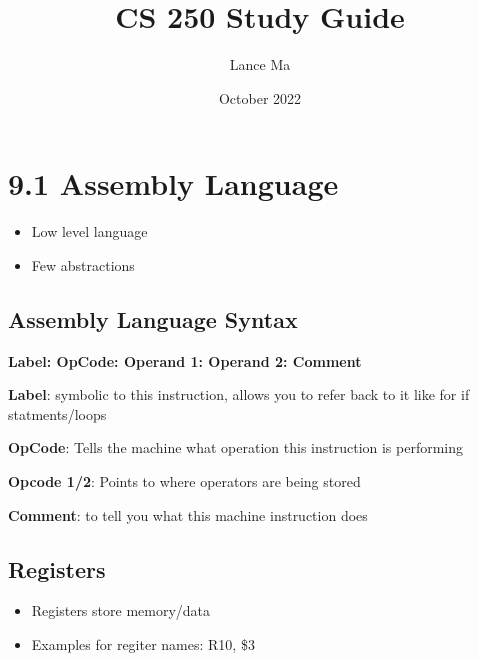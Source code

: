 \documentclass{article}
\title{CS 250 Study Guide}
\author{Lance Ma}
\date{October 2022}
\begin{document}
\maketitle

\section{9.1 Assembly Language}

\begin{itemize}
    \item Low level language
    
    \item Few abstractions
\end{itemize}


\subsection{Assembly Language Syntax}

\textbf{Label: OpCode: Operand 1: Operand 2: Comment}

\textbf{Label}: symbolic to this instruction, allows you to refer back to it like for if statments/loops

\textbf{OpCode}: Tells the machine what operation this instruction is performing

\textbf{Opcode 1/2}: Points to where operators are being stored 

\textbf{Comment}: to tell you what this machine instruction does

\subsection{Registers}

\begin{itemize}
    \item Registers store memory/data
    \item Examples for regiter names: R10, \$3 
\end{itemize}
\end{document}
